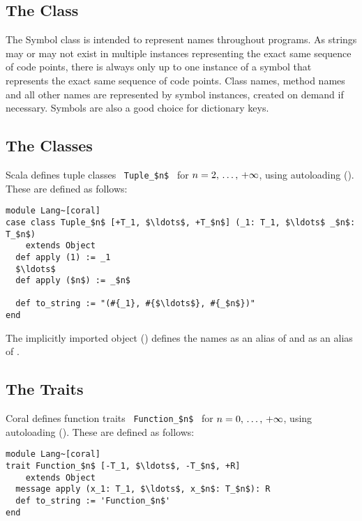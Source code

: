 \subsection{The  Class}


The Symbol class is intended to represent names throughout programs. As strings may or may not exist in multiple instances representing the exact same sequence of code points, there is always only up to one instance of a symbol that represents the exact same sequence of code points. Class names, method names and all other names are represented by symbol instances, created on demand if necessary. Symbols are also a good choice for dictionary keys. 





\subsection{The  Classes}

Scala defines tuple classes ~\lstinline!Tuple_$n$!~ for $n = 2 ,\, \ldots ,\, +\infty$, using autoloading (). These are defined as follows:

\begin{lstlisting}
module Lang~[coral]
case class Tuple_$n$ [+T_1, $\ldots$, +T_$n$] (_1: T_1, $\ldots$ _$n$: T_$n$)
    extends Object
  def apply (1) := _1
  $\ldots$
  def apply ($n$) := _$n$
  
  def to_string := "(#{_1}, #{$\ldots$}, #{_$n$})"
end
\end{lstlisting}

The implicitly imported  object () defines the names  as an alias of  and  as an alias of . 






\subsection{The  Traits}

Coral defines function traits ~\lstinline!Function_$n$!~ for $n = 0 ,\, \ldots ,\, +\infty$, using autoloading (). These are defined as follows: 

\begin{lstlisting}
module Lang~[coral]
trait Function_$n$ [-T_1, $\ldots$, -T_$n$, +R]
    extends Object
  message apply (x_1: T_1, $\ldots$, x_$n$: T_$n$): R
  def to_string := 'Function_$n$'
end
\end{lstlisting}

